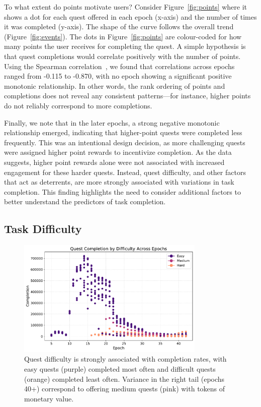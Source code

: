 To what extent do points motivate users? Consider Figure~\ref{fig:points} where it shows a dot for each quest offered in each epoch (x-axis) and the number of times it was completed (y-axis). The shape of the curve follows the overall trend (Figure~\ref{fig:events}). The dots in Figure~\ref{fig:points} are colour-coded for how many points the user receives for completing the quest. A simple hypothesis is that quest completions would correlate positively with the number of points. Using the Spearman correlation~\cite{Spe04}, we found that correlations across epochs ranged from -0.115 to -0.870, with no epoch showing a significant positive monotonic relationship. In other words, the rank ordering of points and completions does not reveal any consistent patterns—for instance, higher points do not reliably correspond to more completions.

Finally, we note that in the later epochs, a strong negative monotonic relationship emerged, indicating that higher-point quests were completed less frequently. This was an intentional design decision, as more challenging quests were assigned higher point rewards to incentivize completion. As the data suggests, higher point rewards alone were not associated with increased engagement for these harder quests. Instead, quest difficulty, and other factors that act as deterrents, are more strongly associated with variations in task completion. This finding highlights the need to consider additional factors to better understand the predictors of task completion.


\subsection{Task Difficulty}

\begin{figure}[t]
    \centering
    \includegraphics[width=0.8\textwidth]{figures/difficulty.pdf}
    \caption{Quest difficulty is strongly associated with completion rates, with easy quests (purple) completed most often and difficult quests (orange) completed least often. Variance in the right tail (epochs 40+) correspond to offering medium quests (pink) with tokens of monetary value.\label{fig:difficulty}}
\end{figure}

